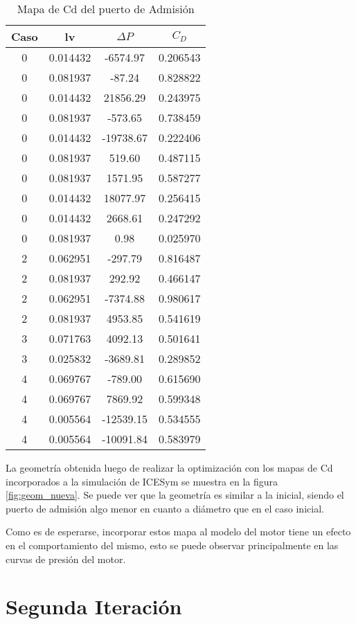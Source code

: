 \begin{table}
  \centering
  \begin{tabular}{cccc} \toprule
      Caso  & lv        & $\Delta P$    & $C_{D}$   \\ \midrule
      0     & 0.014432  & -6574.97      &  0.206543 \\
      0     & 0.081937  & -87.24        &  0.828822 \\
      0     & 0.014432  & 21856.29      &  0.243975 \\
      0     & 0.081937  & -573.65       &  0.738459 \\
      0     & 0.014432  & -19738.67     &  0.222406 \\
      0     & 0.081937  & 519.60        &  0.487115 \\
      0     & 0.081937  & 1571.95       &  0.587277 \\
      0     & 0.014432  & 18077.97      &  0.256415 \\
      0     & 0.014432  & 2668.61       &  0.247292 \\
      0     & 0.081937  & 0.98          &  0.025970 \\
      2     & 0.062951  & -297.79       &  0.816487 \\
      2     & 0.081937  & 292.92        &  0.466147 \\
      2     & 0.062951  & -7374.88      &  0.980617 \\
      2     & 0.081937  & 4953.85       &  0.541619 \\
      3     & 0.071763  & 4092.13       &  0.501641 \\
      3     & 0.025832  & -3689.81      &  0.289852 \\
      4     & 0.069767  & -789.00       &  0.615690 \\
      4     & 0.069767  & 7869.92       &  0.599348 \\
      4     & 0.005564  & -12539.15     &  0.534555 \\
      4     & 0.005564  & -10091.84     &  0.583979 \\ \bottomrule
    \end{tabular}
  \caption{Mapa de Cd del puerto de Admisión} \label{tab:mapa_cd_admision}
\end{table}


La geometría obtenida luego de realizar la optimización con los mapas de Cd
incorporados a la simulación de ICESym se muestra en la figura \ref{fig:geom_nueva}.
%
Se puede ver que la geometría es similar a la inicial, siendo el puerto de
admisión algo menor en cuanto a diámetro que en el caso inicial.

Como es de esperarse, incorporar estos mapa al modelo del motor tiene un efecto
en el comportamiento del mismo, esto se puede observar principalmente en las
curvas de presión del motor.

\section{Segunda Iteración}
